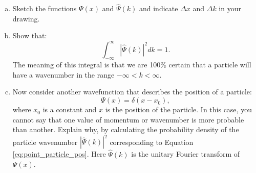 \begin{enumerate}
\begin{enumerate}[a)]
          \item Sketch the functions $\Psi(x)$ and $\hat{\Psi}(k)$ and indicate $\Delta x$ and $\Delta k$ in your drawing.

          \item Show that:
                \[ \int_{-\infty}^{\infty} |\hat{\Psi}(k)|^{2}dk=1. \]
                The meaning of this integral is that we are 100\% certain that a particle 
                will have a wavenumber in the range $-\infty<k<\infty$.

          \item Now consider another wavefunction that describes the position of a particle:
                \begin{equation}
                  \Psi(x) = \delta(x-x_0),
                  \label{eq:point_particle_pos}
                \end{equation}
                where $x_0$ is a constant and $x$ is the position of the particle. In
                this case, you cannot say that one value of momentum or wavenumber is
                more probable than another. Explain why, by calculating the
                probability density of the particle wavenumber $|\hat{\Psi}(k)|^2$
                corresponding to Equation \ref{eq:point_particle_pos}. Here
                $\hat{\Psi}(k)$ is the unitary Fourier transform of $\Psi(x)$.

        \end{enumerate}



\end{enumerate}
